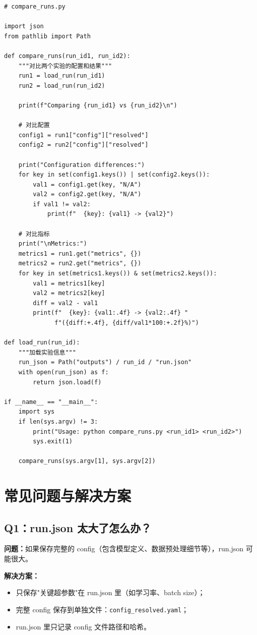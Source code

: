 \begin{verbatim}
# compare_runs.py

import json
from pathlib import Path

def compare_runs(run_id1, run_id2):
    """对比两个实验的配置和结果"""
    run1 = load_run(run_id1)
    run2 = load_run(run_id2)

    print(f"Comparing {run_id1} vs {run_id2}\n")

    # 对比配置
    config1 = run1["config"]["resolved"]
    config2 = run2["config"]["resolved"]

    print("Configuration differences:")
    for key in set(config1.keys()) | set(config2.keys()):
        val1 = config1.get(key, "N/A")
        val2 = config2.get(key, "N/A")
        if val1 != val2:
            print(f"  {key}: {val1} -> {val2}")

    # 对比指标
    print("\nMetrics:")
    metrics1 = run1.get("metrics", {})
    metrics2 = run2.get("metrics", {})
    for key in set(metrics1.keys()) & set(metrics2.keys()):
        val1 = metrics1[key]
        val2 = metrics2[key]
        diff = val2 - val1
        print(f"  {key}: {val1:.4f} -> {val2:.4f} "
              f"({diff:+.4f}, {diff/val1*100:+.2f}%)")

def load_run(run_id):
    """加载实验信息"""
    run_json = Path("outputs") / run_id / "run.json"
    with open(run_json) as f:
        return json.load(f)

if __name__ == "__main__":
    import sys
    if len(sys.argv) != 3:
        print("Usage: python compare_runs.py <run_id1> <run_id2>")
        sys.exit(1)

    compare_runs(sys.argv[1], sys.argv[2])
\end{verbatim}

\section{常见问题与解决方案}

\subsection{Q1：run.json 太大了怎么办？}

\textbf{问题：}如果保存完整的 config（包含模型定义、数据预处理细节等），run.json 可能很大。

\textbf{解决方案：}
\begin{itemize}
  \item 只保存"关键超参数"在 run.json 里（如学习率、batch size）；
  \item 完整 config 保存到单独文件：\texttt{config\_resolved.yaml}；
  \item run.json 里只记录 config 文件路径和哈希。
\end{itemize}

